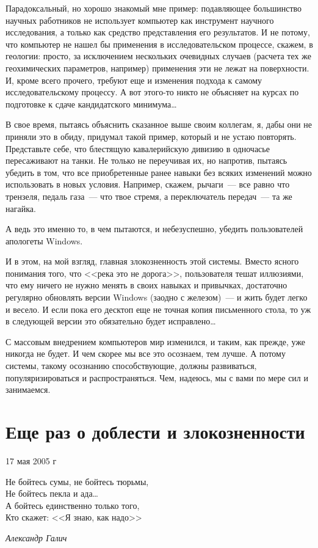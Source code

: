 Парадоксальный, но хорошо знакомый мне пример: подавляющее большинство научных работников не использует компьютер как инструмент научного исследования, а только как средство представления его результатов. И не потому, что компьютер не нашел бы применения в исследовательском процессе, скажем, в геологии: просто, за исключением нескольких очевидных случаев (расчета тех же геохимических параметров, например) применения эти не лежат на поверхности. И, кроме всего прочего, требуют еще и изменения подхода к самому исследовательскому процессу. А вот этого-то никто не объясняет на курсах по подготовке к сдаче кандидатского минимума\dots 

В свое время, пытаясь объяснить сказанное выше своим коллегам, я, дабы они не приняли это в обиду, придумал такой пример, который и не устаю повторять. Представьте себе, что блестящую кавалерийскую дивизию в одночасье пересаживают на танки. Не только не переучивая их, но напротив, пытаясь убедить в том, что все приобретенные ранее навыки без всяких изменений можно использовать в новых условия. Например, скажем, рычаги~--- все равно что трензеля, педаль газа~--- что твое стремя, а переключатель передач~--- та же нагайка. 

А ведь это именно то, в чем пытаются, и небезуспешно, убедить пользователей апологеты Windows.

И в этом, на мой взгляд, главная злокозненность этой системы. Вместо ясного понимания того, что <<река это не дорога>>, пользователя тешат иллюзиями, что ему ничего не нужно менять в своих навыках и привычках, достаточно регулярно обновлять версии Windows (заодно с железом)~--- и жить будет легко и весело. И если пока его десктоп еще не точная копия письменного стола, то уж в следующей версии это обязательно будет исправлено\dots 

С массовым внедрением компьютеров мир изменился, и таким, как прежде, уже никогда не будет. И чем скорее мы все это осознаем, тем лучше. А потому системы, такому осознанию способствующие, должны развиваться, популяризироваться и распространяться. Чем, надеюсь, мы с вами по мере сил и занимаемся.

\section{Еще раз о доблести и злокозненности} 
\begin{timeline}17 мая 2005 г\end{timeline}

\hfill \begin{minipage}[h]{0.45\textwidth}
Не бойтесь сумы, не бойтесь тюрьмы,\\
Не бойтесь пекла и ада\dots\\
А бойтесь единственно только того,\\
Кто скажет: <<Я знаю, как надо>>
\begin{flushright}
\textit{Александр Галич}
\end{flushright}
\bigskip\end{minipage}


